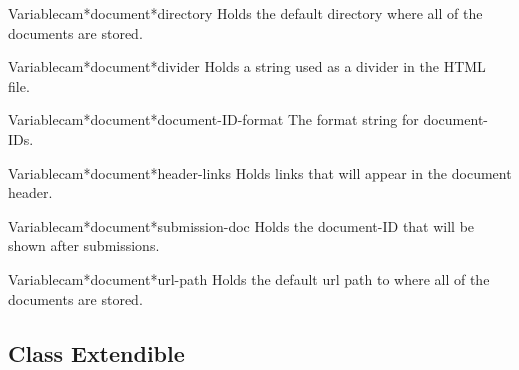 \begin{functiondoc}{Variable}{cam*document*directory}{}
Holds the default directory where all of the documents are stored.
\end{functiondoc}

\begin{functiondoc}{Variable}{cam*document*divider}{}
Holds a string used as a divider in the HTML file.
\end{functiondoc}

\begin{functiondoc}{Variable}{cam*document*document-ID-format}{}
The format string for document-IDs.
\end{functiondoc}

\begin{functiondoc}{Variable}{cam*document*header-links}{}
Holds links that will appear in the document header.
\end{functiondoc}

\begin{functiondoc}{Variable}{cam*document*submission-doc}{}
Holds the document-ID that will be shown after submissions.
\end{functiondoc}

\begin{functiondoc}{Variable}{cam*document*url-path}{}
Holds the default url path to where all of the documents are stored.
\end{functiondoc}


\clearpage

\subsection{Class Extendible}


